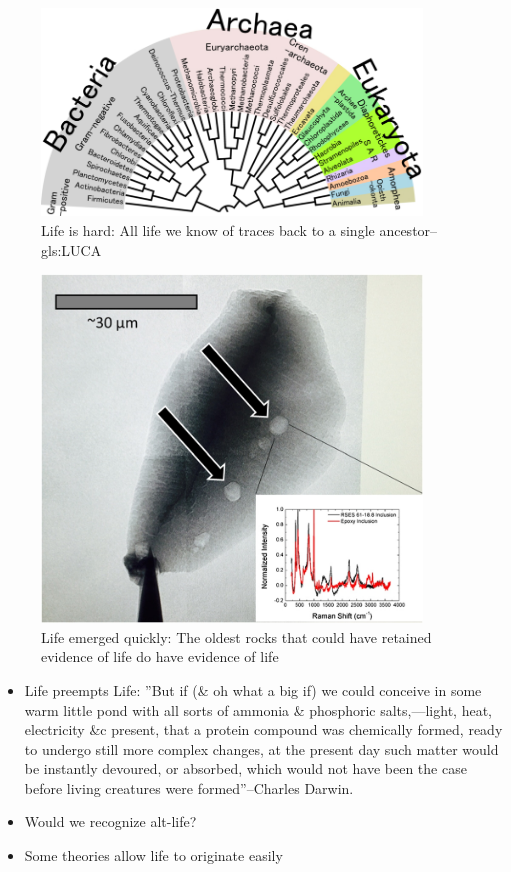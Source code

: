 \documentclass[]{article}
\begin{document}
\begin{figure}[H]
	\caption{Life is hard: All life we know of traces back to a single 		ancestor--\gls{gls:LUCA}}\label{fig:luca} 
	\includegraphics[width=0.9\textwidth]{Luca}
\end{figure}

\begin{figure}[H]
	\caption{Life emerged quickly: The oldest rocks that could have retained evidence of life do have evidence of life\cite{bell2015potentially}}\label{fig:zircons} 
	\includegraphics[width=0.9\textwidth]{Zircons}
\end{figure}

\begin{itemize}
	\item Life preempts Life: ''But if (\& oh what a big if) we could conceive in some warm little pond with all sorts of ammonia \& phosphoric salts,—light, heat, electricity \&c present, that a protein compound was chemically formed, ready to undergo still more complex changes, at the present day such matter would be instantly devoured, or absorbed, which would not have been the case before living creatures were formed''--Charles Darwin\cite{darwin1871letter}.
	
	\item Would we recognize alt-life?
	
	\item Some theories allow life to originate easily\cite{wachtershauser1988before}
\end{itemize}
\end{document}
